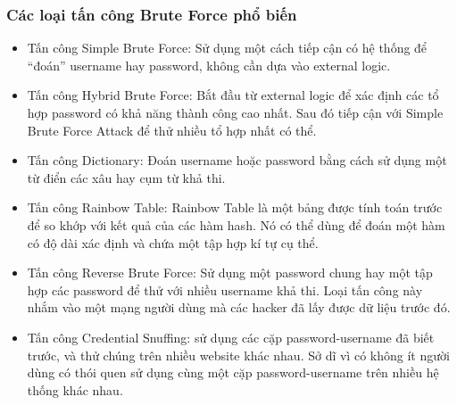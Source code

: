 \subsubsection{Các loại tấn công Brute Force phổ biến }
\begin{itemize}
    \item Tấn công Simple Brute Force: Sử dụng một cách tiếp cận có hệ thống để “đoán” username hay password, không cần dựa vào external logic.
    \item Tấn công Hybrid Brute Force: Bắt đầu từ external logic để xác định các tổ hợp password có khả năng thành công cao nhất. Sau đó tiếp cận với Simple Brute Force Attack để thử nhiều tổ hợp nhất có thể.
    \item Tấn công Dictionary: Đoán username hoặc password bằng cách sử dụng một từ điển các xâu hay cụm từ khả thi.
    \item Tấn công Rainbow Table: Rainbow Table là một bảng được tính toán trước để so khớp với kết quả của các hàm hash. Nó có thể dùng để đoán một hàm có độ dài xác định và chứa một tập hợp kí tự cụ thể.
    \item Tấn công Reverse Brute Force: Sử dụng một password chung hay một tập hợp các password để thử với nhiều username khả thi. Loại tấn công này nhắm vào một mạng người dùng mà các hacker đã lấy được dữ liệu trước đó.
    \item Tấn công Credential Snuffing: sử dụng các cặp password-username đã biết trước, và thử chúng trên nhiều website khác nhau. Sở dĩ vì có không ít người dùng có thói quen sử dụng cùng một cặp password-username trên nhiều hệ thống khác nhau.

\end{itemize}
